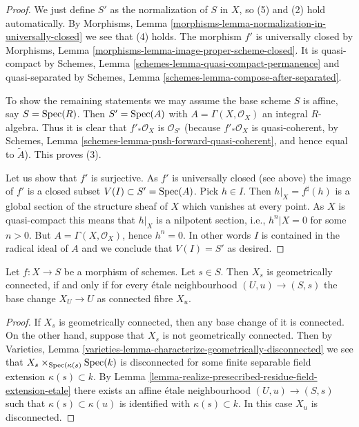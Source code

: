 \begin{proof}
We just define $S'$ as the normalization of $S$ in $X$, so (5) and (2) hold
automatically. By
Morphisms, Lemma \ref{morphisms-lemma-normalization-in-universally-closed}
we see that (4) holds. The morphism $f'$ is universally closed by
Morphisms, Lemma \ref{morphisms-lemma-image-proper-scheme-closed}.
It is quasi-compact by
Schemes, Lemma \ref{schemes-lemma-quasi-compact-permanence}
and quasi-separated by
Schemes, Lemma \ref{schemes-lemma-compose-after-separated}.

\medskip\noindent
To show the remaining statements we may assume the base scheme $S$ is affine,
say $S = \mathop{\rm Spec}(R)$. Then $S' = \mathop{\rm Spec}(A)$ with
$A = \Gamma(X, \mathcal{O}_X)$ an integral $R$-algebra.
Thus it is clear that $f'_*\mathcal{O}_X$
is $\mathcal{O}_{S'}$ (because $f'_*\mathcal{O}_X$ is quasi-coherent,
by
Schemes, Lemma
\ref{schemes-lemma-push-forward-quasi-coherent},
and hence equal to $\widetilde{A}$). This proves (3).

\medskip\noindent
Let us show that $f'$ is surjective. As $f'$ is universally closed (see above)
the image of $f'$ is a closed subset
$V(I) \subset S' = \mathop{\rm Spec}(A)$. Pick $h \in I$. Then
$h|_X = f^\sharp(h)$ is a global section of the structure sheaf of
$X$ which vanishes at every point. As $X$ is quasi-compact this means
that $h|_X$ is a nilpotent section, i.e., $h^n|X = 0$ for some $n > 0$.
But $A = \Gamma(X, \mathcal{O}_X)$, hence $h^n = 0$.
In other words $I$ is contained in the radical ideal of $A$ and we conclude
that $V(I) = S'$ as desired.
\end{proof}

\begin{lemma}
\label{lemma-characterize-geometrically-connected-fibres}
Let $f : X \to S$ be a morphism of schemes.
Let $s \in S$. Then $X_s$ is geometrically connected, if and
only if for every \'etale neighbourhood $(U, u) \to (S, s)$
the base change $X_U \to U$ as connected fibre $X_u$.
\end{lemma}

\begin{proof}
If $X_s$ is geometrically connected, then any base change of it is connected.
On the other hand, suppose that $X_s$ is not geometrically connected.
Then by
Varieties, Lemma
\ref{varieties-lemma-characterize-geometrically-disconnected}
we see that $X_s \times_{\mathop{\rm Spec}(\kappa(s)} \mathop{\rm Spec}(k)$ is
disconnected for some
finite separable field extension $\kappa(s) \subset k$. By
Lemma \ref{lemma-realize-presecribed-residue-field-extension-etale}
there exists an affine \'etale neighbourhood $(U, u) \to (S, s)$ such that
$\kappa(s) \subset \kappa(u)$ is identified with $\kappa(s) \subset k$.
In this case $X_u$ is disconnected.
\end{proof}

